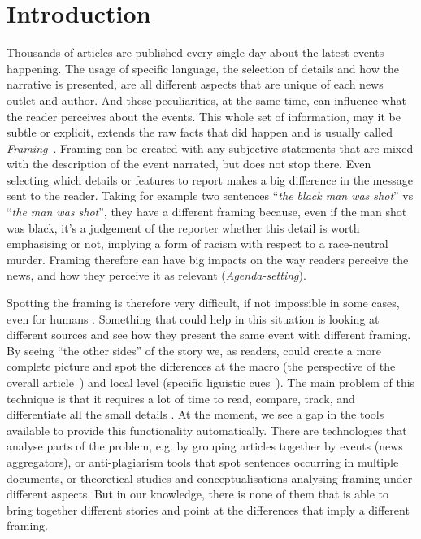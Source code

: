 \chapter{Introduction}


Thousands of articles are published every single day about the latest events happening.
The usage of specific language, the selection of details and how the narrative is presented, are all different aspects that are unique of each news outlet and author.
And these peculiarities, at the same time, can influence what the reader perceives about the events.
This whole set of information, may it be subtle or explicit, extends the raw facts that did happen and is usually called \emph{Framing}~\cite{gamson1989media,scheufele1999framing}.
Framing can be created with any subjective statements that are mixed with the description of the event narrated, but does not stop there.
Even selecting which details or features to report makes a big difference in the message sent to the reader.
Taking for example two sentences ``\textit{the black man was shot}'' vs ``\textit{the man was shot}'', they have a different framing because, even if the man shot was black, it's a judgement of the reporter whether this detail is worth emphasising or not, implying a form of racism with respect to a race-neutral murder.
Framing therefore can have big impacts on the way readers perceive the news, and how they perceive it as relevant (\textit{Agenda-setting}).



Spotting the framing is therefore very difficult, if not impossible in some cases, even for humans . Something that could help in this situation is looking at different sources and see how they present the same event with different framing.
By seeing ``the other sides'' of the story we, as readers, could create a more complete picture and spot the differences at the macro (the perspective of the overall article~\cite{gamson1989media}) and local level (specific liguistic cues~\cite{TODO}).
The main problem of this technique is that it requires a lot of time to read, compare, track, and differentiate all the small details .
At the moment, we see a gap in the tools available to provide this functionality automatically.
There are technologies that analyse parts of the problem, e.g. by grouping articles together by events (news aggregators), or anti-plagiarism tools that spot sentences occurring in multiple documents, or theoretical studies and conceptualisations analysing framing under different aspects.
But in our knowledge, there is none of them that is able to bring together different stories and point at the differences that imply a different framing.


